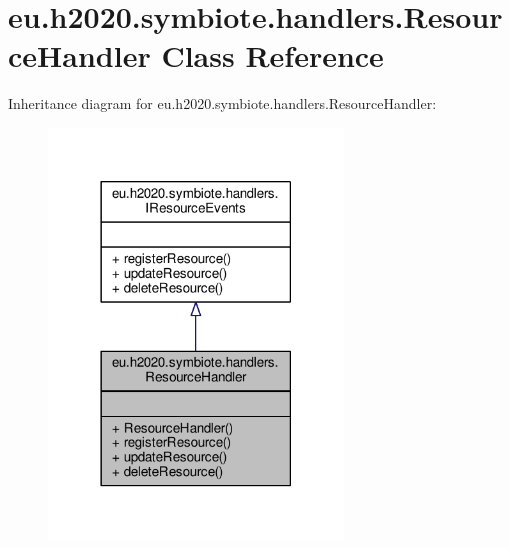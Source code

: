 \hypertarget{classeu_1_1h2020_1_1symbiote_1_1handlers_1_1ResourceHandler}{}\section{eu.\+h2020.\+symbiote.\+handlers.\+Resource\+Handler Class Reference}
\label{classeu_1_1h2020_1_1symbiote_1_1handlers_1_1ResourceHandler}


Inheritance diagram for eu.\+h2020.\+symbiote.\+handlers.\+Resource\+Handler\+:
\nopagebreak
\begin{figure}[H]
\begin{center}
\leavevmode
\includegraphics[width=222pt]{classeu_1_1h2020_1_1symbiote_1_1handlers_1_1ResourceHandler__inherit__graph}
\end{center}
\end{figure}


